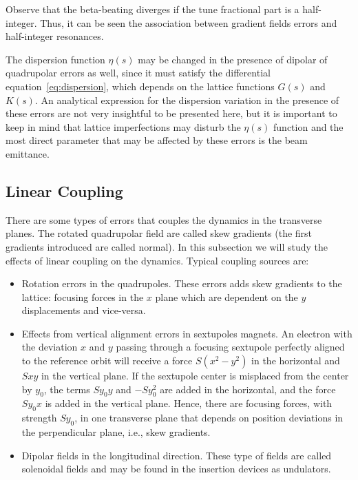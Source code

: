 Observe that the beta-beating diverges if the tune fractional part is a half-integer. Thus, it can be seen the association between gradient fields errors and half-integer resonances.

The dispersion function $\eta(s)$ may be changed in the presence of dipolar of quadrupolar errors as well, since it must satisfy the differential equation~\eqref{eq:dispersion}, which depends on the lattice functions $G(s)$ and $K(s)$. An analytical expression for the dispersion variation in the presence of these errors are not very insightful to be presented here, but it is important to keep in mind that lattice imperfections may disturb the $\eta(s)$ function and the most direct parameter that may be affected by these errors is the beam emittance.

\subsection{Linear Coupling}\label{subsec:linear_coupling}

There are some types of errors that couples the dynamics in the transverse planes. The rotated quadrupolar field are called skew gradients (the first gradients introduced are called normal). In this subsection we will study the effects of linear coupling on the dynamics. Typical coupling sources are:

\begin{itemize}
    \item Rotation errors in the quadrupoles. These errors adds skew gradients to the lattice: focusing forces in the $x$ plane which are dependent on the $y$ displacements and vice-versa.
    
    \item Effects from vertical alignment errors in sextupoles magnets. An electron with the deviation $x$ and $y$ passing through a focusing sextupole perfectly aligned to the reference orbit will receive a force $S(x^2-y^2)$ in the horizontal and $Sxy$ in the vertical plane. If the sextupole center is misplaced from the center by $y_0$, the terms $Sy_0 y$ and $-Sy_0^2$ are added in the horizontal, and the force $Sy_0 x$ is added in the vertical plane. Hence, there are focusing forces, with strength $Sy_0$, in one transverse plane that depends on position deviations in the perpendicular plane, i.e., skew gradients.
    
    \item Dipolar fields in the longitudinal direction. These type of fields are called solenoidal fields and may be found in the insertion devices as undulators.
\end{itemize}

